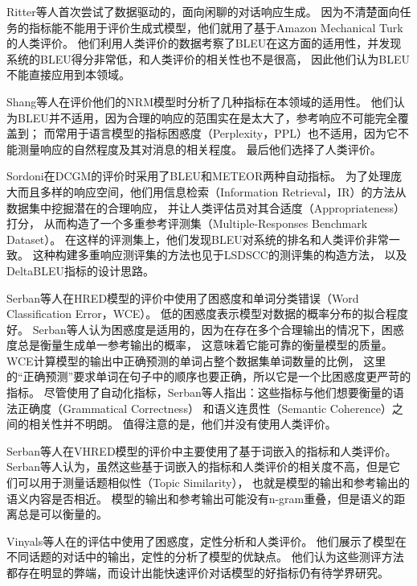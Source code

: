 Ritter等人首次尝试了数据驱动的，面向闲聊的对话响应生成。
因为不清楚面向任务的指标能不能用于评价生成式模型，他们就用了基于Amazon Mechanical Turk的人类评价。
他们利用人类评价的数据考察了BLEU在这方面的适用性，并发现系统的BLEU得分非常低，和人类评价的相关性也不是很高，
因此他们认为BLEU不能直接应用到本领域。


Shang等人在评价他们的NRM模型时分析了几种指标在本领域的适用性。
他们认为BLEU并不适用，因为合理的响应的范围实在是太大了，参考响应不可能完全覆盖到；
而常用于语言模型的指标困惑度（Perplexity，PPL）也不适用，因为它不能测量响应的自然程度及其对消息的相关程度。
最后他们选择了人类评价。

Sordoni在DCGM的评价时采用了BLEU和METEOR两种自动指标。
为了处理庞大而且多样的响应空间，他们用信息检索（Information Retrieval，IR）的方法从数据集中挖掘潜在的合理响应，
并让人类评估员对其合适度（Appropriateness）打分，
从而构造了一个多重参考评测集（Multiple-Responses Benchmark Dataset）。
在这样的评测集上，他们发现BLEU对系统的排名和人类评价非常一致。
这种构建多重响应测评集的方法也见于LSDSCC的测评集的构造方法，
以及DeltaBLEU指标的设计思路。

Serban等人在HRED模型的评价中使用了困惑度和单词分类错误（Word Classification Error，WCE）。
低的困惑度表示模型对数据的概率分布的拟合程度好。
Serban等人认为困惑度是适用的，因为在存在多个合理输出的情况下，困惑度总是衡量生成单一参考输出的概率，
这意味着它能可靠的衡量模型的质量。
WCE计算模型的输出中正确预测的单词占整个数据集单词数量的比例，
这里的“正确预测”要求单词在句子中的顺序也要正确，所以它是一个比困惑度更严苛的指标。
尽管使用了自动化指标，Serban等人指出：这些指标与他们想要衡量的语法正确度（Grammatical Correctness）
和语义连贯性（Semantic Coherence）之间的相关性并不明朗。
值得注意的是，他们并没有使用人类评价。

Serban等人在VHRED模型的评价中主要使用了基于词嵌入的指标和人类评价。
Serban等人认为，虽然这些基于词嵌入的指标和人类评价的相关度不高，但是它们可以用于测量话题相似性（Topic Similarity），
也就是模型的输出和参考输出的语义内容是否相近。
模型的输出和参考输出可能没有n-gram重叠，但是语义的距离总是可以衡量的。

Vinyals等人在\cite{GoogleChatbot}的评估中使用了困惑度，定性分析和人类评价。
他们展示了模型在不同话题的对话中的输出，定性的分析了模型的优缺点。
他们认为这些测评方法都存在明显的弊端，而设计出能快速评价对话模型的好指标仍有待学界研究。


